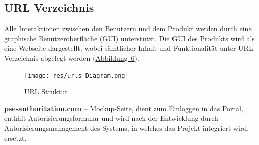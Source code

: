\documentclass[parskip=full,11pt]{scrartcl}
\begin{document}
  \subsection{URL Verzeichnis}
Alle Interaktionen zwischen den Benutzern und dem Produkt werden durch eine graphische Benutzeroberfläche (GUI) unterstützt. Die \gls{GUI} des Produkts wird als eine Webseite dargestellt, wobei sämtlicher Inhalt und Funktionalität unter URL Verzeichnis abgelegt werden (\hyperref[URL Struktur]{\mbox{Abbildung 6}}). 

\begin{figure}[ht!]
 	\centering
 	\texttt{[image: res/urls\_Diagram.png]}
 	\caption{URL Struktur}
 	\label{URL-Struktur}
 \end{figure}
 
\textbf{pse-authoritation.com} – Mockup-Seite, dient zum Einloggen in das Portal, enthält Autorisierungsformular und wird nach der Entwicklung durch Autorisierungsmanagement des Systems, in welches das Projekt integriert wird, ersetzt. 
 
\end{document}
